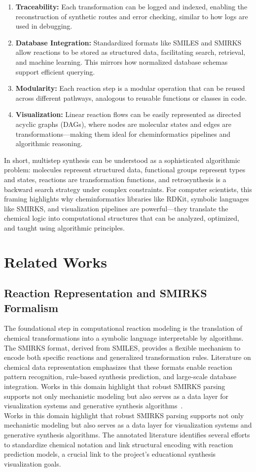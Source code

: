 \documentclass[12pt]{article}
\begin{document}
\begin{enumerate}
    \item \textbf{Traceability:} Each transformation can be logged and indexed, enabling the reconstruction of synthetic routes and error checking, similar to how logs are used in debugging.
    \item \textbf{Database Integration:} Standardized formats like SMILES and SMIRKS allow reactions to be stored as structured data, facilitating search, retrieval, and machine learning. This mirrors how normalized database schemas support efficient querying.
    \item \textbf{Modularity:} Each reaction step is a modular operation that can be reused across different pathways, analogous to reusable functions or classes in code.
    \item \textbf{Visualization:} Linear reaction flows can be easily represented as directed acyclic graphs (DAGs), where nodes are molecular states and edges are transformations—making them ideal for cheminformatics pipelines and algorithmic reasoning.
\end{enumerate}

In short, multistep synthesis can be understood as a sophisticated algorithmic problem: molecules represent structured data, functional groups represent types and states, reactions are transformation functions, and retrosynthesis is a backward search strategy under complex constraints.
For computer scientists, this framing highlights why cheminformatics libraries like RDKit, symbolic languages like SMIRKS, and visualization pipelines are powerful—they translate the chemical logic into computational structures that can be analyzed, optimized, and taught using algorithmic principles.

\section{Related Works}
\subsection{Reaction Representation and SMIRKS Formalism}
\indent
The foundational step in computational reaction modeling is the translation of chemical transformations into a symbolic language interpretable by algorithms.
The SMIRKS format, derived from SMILES, provides a flexible mechanism to encode both specific reactions and generalized transformation rules.
Literature on chemical data representation emphasizes that these formats enable reaction pattern recognition, rule-based synthesis prediction, and large-scale database integration.
Works in this domain highlight that robust SMIRKS parsing supports not only mechanistic modeling but also serves as a data layer for visualization systems and generative synthesis algorithms~\cite{10.1002/ail2.91}.
\\
\indent
Works in this domain highlight that robust SMIRKS parsing supports not only mechanistic modeling but also serves as a data layer for visualization systems and generative synthesis algorithms.
The annotated literature identifies several efforts to standardize chemical notation and link structural encoding with reaction prediction models, a crucial link to the project’s educational synthesis visualization goals.
\end{document}
